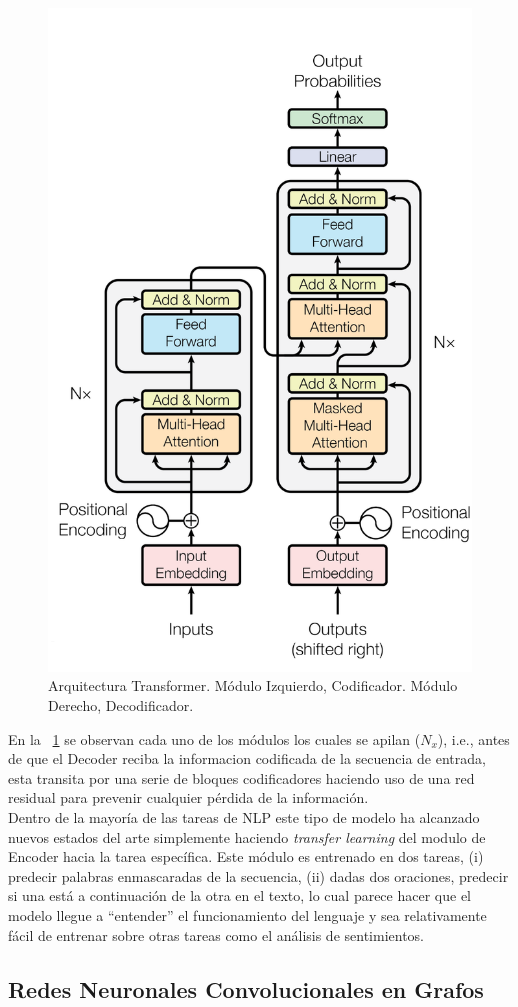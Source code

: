 	\begin{figure}[!thb]
		\begin{center}
			\includegraphics[width=.5\linewidth, height=.5\textheight]{images/transformer.png}
		\end{center}
		\caption[Arquitectura Transformer]{Arquitectura Transformer. Módulo Izquierdo, Codificador. Módulo Derecho, Decodificador. \citep{vaswani2017attention} }
		\label{transformer}
	\end{figure}
	En la \figurename~\ref{transformer} se observan cada uno de los módulos los cuales se apilan ($N_x$), i.e., antes de que el Decoder reciba la informacion codificada de la secuencia de entrada, esta transita por una serie de bloques codificadores haciendo uso de una red residual para prevenir cualquier pérdida de la información.
	\\
	Dentro de la mayoría de las tareas de NLP este tipo de modelo ha alcanzado nuevos estados del arte simplemente haciendo \textit{transfer learning} del modulo de Encoder hacia la tarea específica. Este módulo es entrenado en dos tareas, (i) predecir palabras enmascaradas de la secuencia, (ii) dadas dos oraciones, predecir si una está a continuación de la otra en el texto, lo cual parece hacer que el modelo llegue a ``entender'' el funcionamiento del lenguaje y sea relativamente fácil de entrenar sobre otras tareas como el análisis de sentimientos. 
	
\subsection{Redes Neuronales Convolucionales en Grafos}
	
